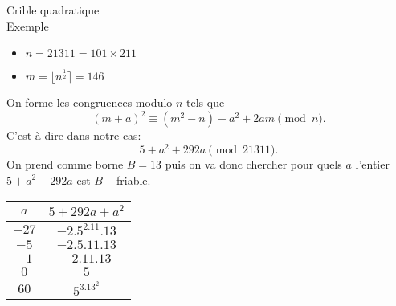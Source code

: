 \documentclass[utf8,10pt,french]{beamer}
\begin{document}
\begin{frame}{Crible quadratique \\ Exemple}
\begin{itemize}
\item $n = 21311 = 101 \times 211$
\item $m  = \lfloor n^{\frac{1}{2}} \rceil = 146$
\end{itemize}
On forme les congruences modulo $n$ tels que \[  (m + a)^2 \equiv (m^2 - n) + a^2 + 2am \pmod n .\]
C'est-à-dire dans notre cas: \[ 5 + a^2 + 292a \pmod{21311} .\]
On prend comme borne $B = 13$ puis on va donc chercher pour quels $a$ l'entier $5 + a^2 + 292a$ est $B-$friable.

\begin{center}
  \begin{tabular}{c|c}
    $a$ & $5 + 292a + a^2$\\
    \hline
    $-27$ & $-2.5^2.11.13$\\
    $ -5$ & $-2.5.11.13$\\
    $-1$ & $-2.11.13$\\
    $0$ & $5$\\
    $60$ & $5^3.13^2$\\
  \end{tabular}
\end{center}

\end{frame}
\end{document}
